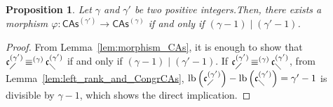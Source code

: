 \documentclass[10pt,reqno]{amsart}
\numberwithin{equation}{subsection}
\newtheorem{Proposition}[Theorem]{Proposition}
\newcommand{\CAs}[1]{\mathsf{CAs}^{(#1)}}
\newcommand{\LComb}[1]{\mathfrak{c}^{(#1)}_{\diagup}}
\newcommand{\RComb}[1]{\mathfrak{c}^{(#1)}_{\diagdown}}
\newcommand{\LBranch}{\mathrm{lb}}
\DeclareMathOperator{\Congr}{\equiv}
\newcommand{\CongrCAs}[1]{\Congr^{(#1)}}
\begin{document}
\begin{Proposition} \label{prop:division_CAs}
    Let $\gamma$ and $\gamma'$ be two positive integers.Then, there
    exists a morphism $\varphi:\CAs{\gamma'} \to \CAs{\gamma}$ if and
    only if $\left(\gamma - 1\right) \mid \left(\gamma' - 1\right)$.
\end{Proposition}
\begin{proof}
    From Lemma~\ref{lem:morphism_CAs}, it is enough to show that
    $\LComb{\gamma'} \CongrCAs{\gamma} \RComb{\gamma'}$ if and only if
    $\left(\gamma-1\right) \mid \left(\gamma'-1\right)$. If
    $\LComb{\gamma'}\CongrCAs{\gamma}\RComb{\gamma'}$, from
    Lemma~\ref{lem:left_rank_and_CongrCAs},
    \begin{math}
        \LBranch\left(\LComb{\gamma'}\right)
        - \LBranch\left(\RComb{\gamma'}\right)
        = \gamma' - 1
    \end{math}
    is divisible by $\gamma-1$, which shows the direct implication.
    \smallbreak


\end{proof}
\end{document}
